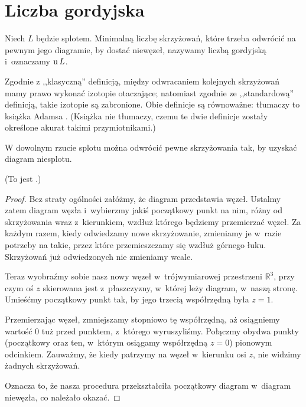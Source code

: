 
\section{Liczba gordyjska}
%

\begin{definition}
    Niech $L$ będzie splotem.
    Minimalną liczbę skrzyżowań, które trzeba odwrócić na pewnym jego diagramie, by dostać niewęzeł, nazywamy liczbą gordyjską i~oznaczamy $\operatorname{u} L$.
\end{definition}

Zgodnie z ,,klasyczną'' definicją, między odwracaniem kolejnych skrzyżowań mamy prawo wykonać izotopie otaczające; natomiast zgodnie ze ,,standardową'' definicją, takie izotopie są zabronione.
Obie definicje są równoważne: tłumaczy to książka Adamsa \cite[s. 58]{adams1994}.
(Książka nie tłumaczy, czemu te dwie definicje zostały określone akurat takimi przymiotnikami.)

\begin{lemma}
\label{lem:unknotting_well_defined}%
    W dowolnym rzucie splotu można odwrócić pewne skrzyżowania tak, by uzyskać diagram niesplotu.
\end{lemma}

(To jest \cite[ćwiczenie E 1.6, s. 15]{burde2014}.)

\begin{proof}
    Bez straty ogólności załóżmy, że diagram przedstawia węzeł.
    Ustalmy zatem diagram węzła i~wybierzmy jakiś początkowy punkt na nim, różny od skrzyżowania wraz z~kierunkiem, wzdłuż którego będziemy przemierzać węzeł.
    Za każdym razem, kiedy odwiedzamy nowe skrzyżowanie, zmieniamy je w~razie potrzeby na takie, przez które przemieszczamy się wzdłuż górnego łuku.
    Skrzyżowań już odwiedzonych nie zmieniamy wcale.

    Teraz wyobraźmy sobie nasz nowy węzeł w~trójwymiarowej przestrzeni $\mathbb R^3$, przy czym oś $z$ skierowana jest z~płaszczyzny, w~której leży diagram, w~naszą stronę.
    Umieśćmy początkowy punkt tak, by jego trzecią współrzędną była $z = 1$.

    Przemierzając węzeł, zmniejszamy stopniowo tę współrzędną, aż osiągniemy wartość $0$ tuż przed punktem, z~którego wyruszyliśmy.
    Połączmy obydwa punkty (początkowy oraz ten, w~którym osiągamy współrzędną $z = 0$) pionowym odcinkiem.
    Zauważmy, że kiedy patrzymy na węzeł w~kierunku osi $z$, nie widzimy żadnych skrzyżowań.

    Oznacza to, że nasza procedura przekształciła początkowy diagram w~diagram niewęzła, co należało okazać.
\end{proof}

